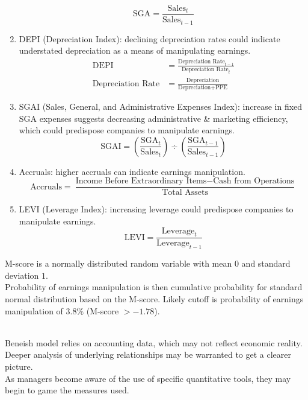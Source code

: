 \begin{definition}
\begin{enumerate}[label=\roman*.]
\begin{equation}
\text{SGA} = \frac{\text{Sales}_{t}}{\text{Sales}_{t-1}} \nonumber
\end{equation}
\item DEPI (Depreciation Index): declining depreciation rates could indicate understated depreciation as a means of manipulating earnings.
\begin{align}
\text{DEPI} &= \frac{\text{Depreciation Rate}_{t-1}}{\text{Depreciation Rate}_{t}} \nonumber \\
\text{Depreciation Rate} &= \frac{\text{Depreciation}}{\text{Depreciation} + \text{PPE}} \nonumber
\end{align}
\item SGAI (Sales, General, and Administrative Expenses Index): increase in fixed SGA expenses suggests decreasing administrative \& marketing efficiency, which could predispose companies to manipulate earnings.
\begin{equation}
\text{SGAI} = \left(\frac{\text{SGA}_t}{\text{Sales}_t} \right) \div \left(\frac{\text{SGA}_{t-1}}{\text{Sales}_{t-1}} \right) \nonumber
\end{equation}
\item Accruals: higher accruals can indicate earnings manipulation.
\begin{equation}
\text{Accruals} = \frac{\text{Income Before Extraordinary Items} - \text{Cash from Operations}}{\text{Total Assets}} \nonumber
\end{equation}
\item LEVI (Leverage Index): increasing leverage could predispose companies to manipulate earnings.
\begin{equation}
\text{LEVI} = \frac{\text{Leverage}_t}{\text{Leverage}_{t-1}} \nonumber
\end{equation}
\end{enumerate}
M-score is a normally distributed random variable with mean $0$ and standard deviation $1$.\\
Probability of earnings manipulation is then cumulative probability for standard normal distribution based on the M-score. Likely cutoff is probability of earnings manipulation of $3.8\%$ (M-score $> -1.78$).
\end{definition}

\begin{remark} \\
Beneish model relies on accounting data, which may not reflect economic reality.\\
Deeper analysis of underlying relationships may be warranted to get a clearer picture.\\
As managers become aware of the use of specific quantitative tools, they may begin to game the measures used. 
\end{remark}

